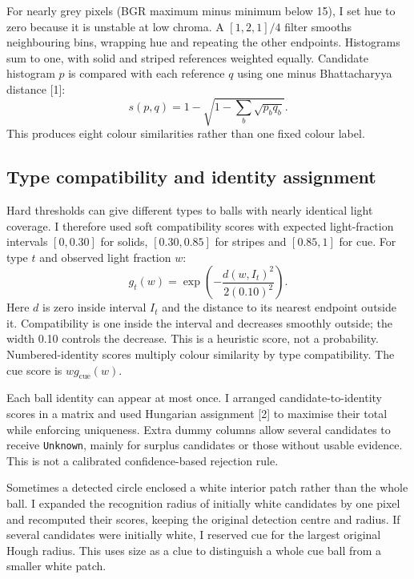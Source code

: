 \documentclass[12pt,a4paper]{article}
\begin{document}
For nearly grey pixels (BGR maximum minus minimum below 15), I set hue to zero
because it is unstable at low chroma. A $[1,2,1]/4$ filter smooths neighbouring bins,
wrapping hue and repeating the other endpoints. Histograms sum to one, with solid
and striped references weighted equally. Candidate histogram $p$ is compared with
each reference $q$ using one minus Bhattacharyya distance [1]:
\[
s(p,q)=1-\sqrt{1-\sum_b\sqrt{p_bq_b}}.
\]
This produces eight colour similarities rather than one fixed colour label.

\newpage
\subsection{Type compatibility and identity assignment}
Hard thresholds can give different types to balls with nearly identical light
coverage. I therefore used soft compatibility scores with expected light-fraction
intervals $[0,0.30]$ for solids, $[0.30,0.85]$ for stripes and $[0.85,1]$ for cue.
For type $t$ and observed light fraction $w$:
\[
g_t(w)=\exp\left(-\frac{d(w,I_t)^2}{2(0.10)^2}\right).
\]
Here $d$ is zero inside interval $I_t$ and the distance to its nearest endpoint
outside it. Compatibility is one inside the interval and decreases smoothly outside;
the width 0.10 controls the decrease. This is a heuristic score, not a probability.
Numbered-identity scores multiply colour similarity by type compatibility. The cue
score is $w g_{\mathrm{cue}}(w)$.

Each ball identity can appear at most once. I arranged candidate-to-identity scores
in a matrix and used Hungarian assignment [2] to maximise their total while enforcing
uniqueness. Extra dummy columns allow several candidates to receive \texttt{Unknown},
mainly for surplus candidates or those without usable evidence. This is not a
calibrated confidence-based rejection rule.

Sometimes a detected circle enclosed a white interior patch rather than the whole
ball. I expanded the recognition radius of initially white candidates by one pixel
and recomputed their scores, keeping the original detection centre and radius.
If several candidates were initially white, I reserved cue for the largest original
Hough radius. This uses size as a clue to distinguish a whole cue ball from
a smaller white patch.
\end{document}
